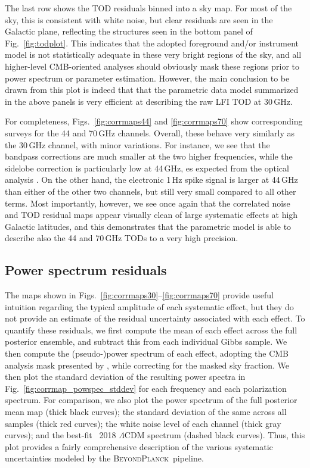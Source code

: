 \documentclass[twocolumn]{aa}
\newcommand{\BP}{\textsc{BeyondPlanck}}
\begin{document}
The last row shows the TOD residuals binned into a sky map. For most
of the sky, this is consistent with white noise, but clear residuals
are seen in the Galactic plane, reflecting the structures seen in the
bottom panel of Fig.~\ref{fig:todplot}. This indicates that the
adopted foreground and/or instrument model is not statistically
adequate in these very bright regions of the sky, and all higher-level
CMB-oriented analyses should obviously mask these regions prior to
power spectrum or parameter estimation. However, the main conclusion
to be drawn from this plot is indeed that that the parametric data
model summarized in the above panels is very efficient at describing
the raw LFI TOD at 30\,GHz.

For completeness, Figs.~\ref{fig:corrmaps44} and \ref{fig:corrmaps70}
show corresponding surveys for the 44 and 70\,GHz channels. Overall,
these behave very similarly as the 30\,GHz channel, with minor
variations. For instance, we see that the bandpass corrections are
much smaller at the two higher frequencies, while the sidelobe
correction is particularly low at 44\,GHz, es expected from 
the optical analysis \citep{Sandri_2010}. On the other hand, the
electronic 1\,Hz spike signal is larger at 44\,GHz than either of the
other two channels, but still very small compared to all other
terms. Most importantly, however, we see once again that the
correlated noise and TOD residual maps appear visually clean of large
systematic effects at high Galactic latitudes, and this demonstrates
that the parametric model is able to describe also the 44 and 70\,GHz
TODs to a very high precision.

\subsection{Power spectrum residuals}

The maps shown in Figs.~\ref{fig:corrmaps30}--\ref{fig:corrmaps70}
provide useful intuition regarding the typical amplitude of each
systematic effect, but they do not provide an estimate of the residual
uncertainty associated with each effect. To quantify these residuals,
we first compute the mean of each effect across the full posterior
ensemble, and subtract this from each individual Gibbs sample. We then
compute the (pseudo-)power spectrum of each effect, adopting the CMB
analysis mask presented by \citet{bp11}, while correcting for the
masked sky fraction. We then plot the standard deviation of the
resulting power spectra in Fig.~\ref{fig:corrmap_powspec_stddev} for
each frequency and each polarization spectrum. For comparison, we also
plot the power spectrum of the full posterior mean map (thick black
curves); the standard deviation of the same across all samples (thick
red curves); the white noise level of each channel (thick gray
curves); and the best-fit \Planck\ 2018 $\Lambda$CDM spectrum (dashed
black curves). Thus, this plot provides a fairly comprehensive
description of the various systematic uncertainties modeled by the
\BP\ pipeline.
\end{document}

